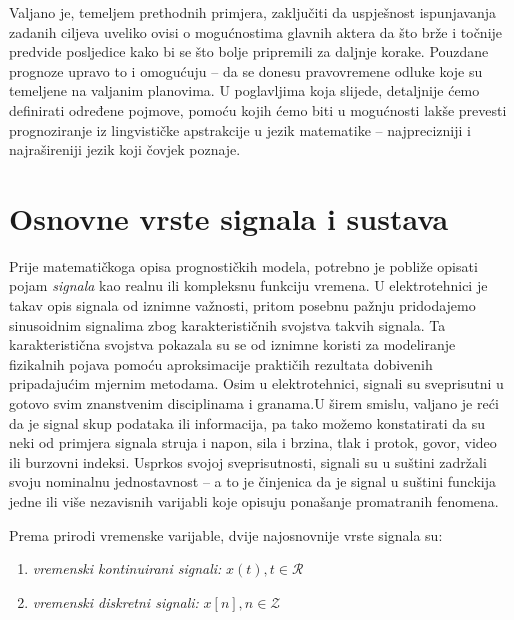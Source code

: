 \documentclass[a4paper,12pt,oneside]{memoir}
\begin{document}
        Valjano je, temeljem prethodnih primjera, zaključiti da uspješnost ispunjavanja zadanih ciljeva uveliko ovisi o mogućnostima glavnih aktera da što brže i točnije predvide posljedice kako bi se što bolje pripremili za daljnje korake. Pouzdane prognoze upravo to i omogućuju -- da se donesu pravovremene odluke koje su temeljene na valjanim planovima. U poglavljima koja slijede, detaljnije ćemo definirati određene pojmove, pomoću kojih ćemo biti u mogućnosti lakše prevesti prognoziranje iz lingvističke apstrakcije u jezik matematike -- najprecizniji i najrašireniji jezik koji čovjek poznaje.


        \section{Osnovne vrste signala i sustava}

            Prije matematičkoga opisa prognostičkih modela, potrebno je pobliže opisati pojam \textit{signala} kao realnu ili kompleksnu funkciju vremena. U elektrotehnici je takav opis signala od iznimne važnosti, pritom posebnu pažnju pridodajemo sinusoidnim signalima zbog karakterističnih svojstva takvih signala. Ta karakteristična svojstva pokazala su se od iznimne koristi za modeliranje fizikalnih pojava pomoću aproksimacije praktičih rezultata dobivenih pripadajućim mjernim metodama. Osim u elektrotehnici, signali su sveprisutni u gotovo svim znanstvenim disciplinama i granama.U širem smislu, valjano je reći da je signal skup podataka ili informacija, pa tako možemo konstatirati da su neki od primjera signala struja i napon, sila i brzina, tlak i protok, govor, video ili burzovni indeksi. Usprkos svojoj sveprisutnosti, signali su u suštini zadržali svoju nominalnu jednostavnost -- a to je činjenica da je signal u suštini funckija jedne ili više nezavisnih varijabli koje opisuju ponašanje promatranih fenomena. 

            
            Prema prirodi vremenske varijable, dvije najosnovnije vrste signala su:
            \begin{enumerate}
                \item \textit{vremenski kontinuirani signali:} $x(t), t\in \mathcal{R}$
                \item \textit{vremenski diskretni signali:} $x[n], n \in \mathcal{Z}$
            \end{enumerate}
\end{document}
